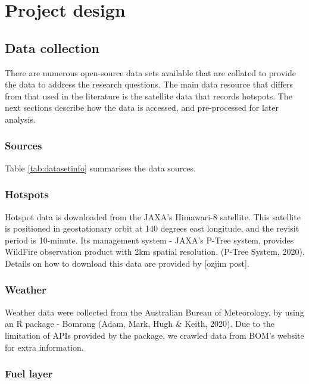 \documentclass[11pt,a4paper,]{article}
\begin{document}
\section{Project design}\label{project-design}

\subsection{Data collection}\label{data-collection}

There are numerous open-source data sets available that are collated to
provide the data to address the research questions. The main data
resource that differs from that used in the literature is the satellite
data that records hotspots. The next sections describe how the data is
accessed, and pre-processed for later analysis.

\subsubsection{Sources}\label{sources}

Table \ref{tab:datasetinfo} summarises the data sources.

\subsubsection{Hotspots}\label{hotspots}

Hotspot data is downloaded from the JAXA's Himawari-8 satellite. This
satellite is positioned in geostationary orbit at 140 degrees east
longitude, and the revisit period is 10-minute. Its management system -
JAXA's P-Tree system, provides WildFire observation product with 2km
spatial resolution. (P-Tree System, 2020). Details on how to download
this data are provided by {[}ozjim post{]}.

\subsubsection{Weather}\label{weather}

Weather data were collected from the Australian Bureau of Meteorology,
by using an R package - Bomrang (Adam, Mark, Hugh \& Keith, 2020). Due
to the limitation of APIs provided by the package, we crawled data from
BOM's website for extra information.

\subsubsection{Fuel layer}\label{fuel-layer}
\end{document}
